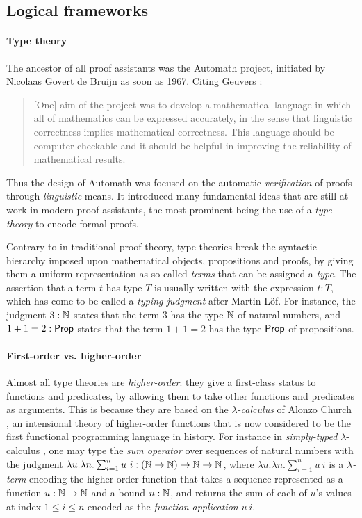 \subsection{Logical frameworks}

\paragraph{Type theory}

The ancestor of all proof assistants was the Automath project, initiated by
Nicolaas Govert de Bruijn as soon as 1967. Citing Geuvers
:
\begin{quote}
[One] aim of the project was to develop a mathematical language in which all of
mathematics can be expressed accurately, in the sense that linguistic
correctness implies mathematical correctness. This language should be computer
checkable and it should be helpful in improving the reliability of mathematical
results.
\end{quote}
Thus the design of Automath was focused on the automatic \emph{verification} of
proofs through \emph{linguistic} means. It introduced many fundamental ideas
that are still at work in modern proof assistants, the most prominent being the
use of a \emph{type theory} to encode formal proofs.

Contrary to  in traditional proof theory, type theories break the
syntactic hierarchy imposed upon mathematical objects, propositions and proofs,
by giving them a uniform representation as so-called \emph{terms} that can be
assigned a \emph{type}. The assertion that a term $t$ has type $T$ is usually
written with the expression $t : T$, which has come to be called a \emph{typing
judgment} after Martin-Löf. For instance, the judgment $3 : \mathbb{N}$ states that
the term $3$ has the type $\mathbb{N}$ of natural numbers, and $1 + 1 = 2 : \mathsf{Prop}$
states that the term $1 + 1 = 2$ has the type $\mathsf{Prop}$ of propositions.

\paragraph{First-order vs. higher-order}

Almost all type theories are \emph{higher-order}: they give a first-class status
to functions and predicates, by allowing them to take other functions and
predicates as arguments. This is because they are based on the
\emph{$\lambda$-calculus} of Alonzo Church
, an intensional theory of
higher-order functions that is now considered to be the first functional
programming language in history. For instance in \emph{simply-typed}
$\lambda$-calculus , one may type
the \emph{sum operator} over sequences of natural numbers with the judgment
$\lambda u. \lambda n. \sum_{i = 1}^{n}{u~i} : (\mathbb{N} \to \mathbb{N}) \to \mathbb{N} \to
\mathbb{N}$, where $\lambda u. \lambda n. \sum_{i = 1}^{n}{u~i}$ is a
\emph{$\lambda$-term} encoding the higher-order function that takes a sequence
represented as a function $u : \mathbb{N} \to \mathbb{N}$ and a bound $n : \mathbb{N}$, and
returns the sum of each of $u$'s values at index $1 \leq i \leq n$ encoded as
the \emph{function application} $u~i$.

